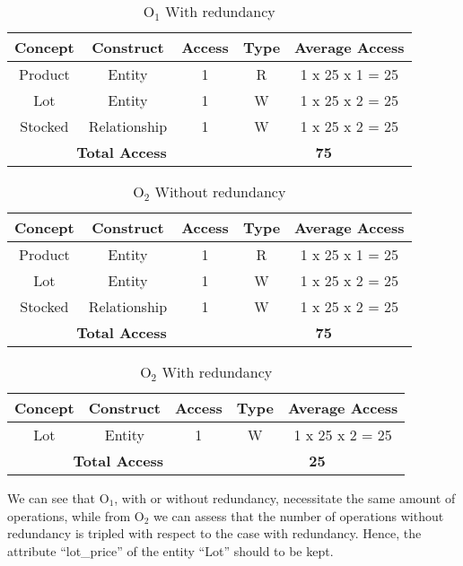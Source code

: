 \begin{table}[!h]\caption{	$ \textrm{O}_\textrm{1} $ With redundancy}
	\begin{center}
		\begin{tabular}{| c | c | c | c | c |}
			\hline
			\textbf{Concept} & \textbf{Construct} & \textbf{Access} & \textbf{Type} & \textbf{Average Access} \\ \hline
			Product & Entity & 1 & R & 1 x 25 x 1 = 25 \\ \hline
			Lot & Entity & 1 & W & 1 x 25 x 2 = 25 \\ \hline
			Stocked & Relationship & 1 & W & 1 x 25 x 2 = 25 \\ \hline
			\multicolumn{3}{|c|}{\textbf{Total Access}} & \multicolumn{2}{|c|}{\textbf{75}} \\ \hline
		\end{tabular}
	\end{center}
\end{table}
\begin{table}[!h]\caption{	$ \textrm{O}_\textrm{2} $ Without redundancy}
	\begin{center}
		\begin{tabular}{| c | c | c | c | c |}
			\hline
			\textbf{Concept} & \textbf{Construct} & \textbf{Access} & \textbf{Type} & \textbf{Average Access} \\ \hline
			Product & Entity & 1 & R & 1 x 25 x 1 = 25 \\ \hline
			Lot & Entity & 1 & W & 1 x 25 x 2 = 25 \\ \hline
			Stocked & Relationship & 1 & W & 1 x 25 x 2 = 25 \\ \hline
			\multicolumn{3}{|c|}{\textbf{Total Access}} & \multicolumn{2}{|c|}{\textbf{75}} \\ \hline
		\end{tabular}
	\end{center}
\end{table}
\begin{table}[!h]\caption{	$ \textrm{O}_\textrm{2} $ With redundancy}
	\begin{center}
		\begin{tabular}{| c | c | c | c | c |}
			\hline
			\textbf{Concept} & \textbf{Construct} & \textbf{Access} & \textbf{Type} & \textbf{Average Access} \\ \hline
			Lot & Entity & 1 & W & 1 x 25 x 2 = 25 \\ \hline
			\multicolumn{3}{|c|}{\textbf{Total Access}} & \multicolumn{2}{|c|}{\textbf{25}} \\ \hline
		\end{tabular}
	\end{center}
\end{table}
We can see that $ \textrm{O}_\textrm{1} $, with or without redundancy, necessitate the same amount of operations, while from $ \textrm{O}_\textrm{2} $ we can assess that the number of operations without redundancy is tripled with respect to the case with redundancy. Hence, the attribute ``lot\_price'' of the entity ``Lot'' should to be kept.

